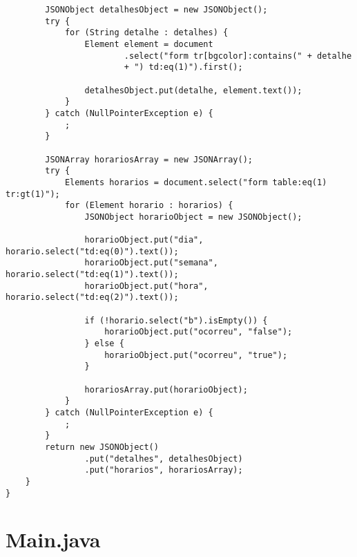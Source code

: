 \begin{lstlisting}
        JSONObject detalhesObject = new JSONObject();
        try {
            for (String detalhe : detalhes) {
                Element element = document
                        .select("form tr[bgcolor]:contains(" + detalhe
                        + ") td:eq(1)").first();

                detalhesObject.put(detalhe, element.text());
            }
        } catch (NullPointerException e) {
            ;
        }

        JSONArray horariosArray = new JSONArray();
        try {
            Elements horarios = document.select("form table:eq(1) tr:gt(1)");
            for (Element horario : horarios) {
                JSONObject horarioObject = new JSONObject();

                horarioObject.put("dia", horario.select("td:eq(0)").text());
                horarioObject.put("semana", horario.select("td:eq(1)").text());
                horarioObject.put("hora", horario.select("td:eq(2)").text());

                if (!horario.select("b").isEmpty()) {
                    horarioObject.put("ocorreu", "false");
                } else {
                    horarioObject.put("ocorreu", "true");
                }

                horariosArray.put(horarioObject);
            }
        } catch (NullPointerException e) {
            ;
        }
        return new JSONObject()
                .put("detalhes", detalhesObject)
                .put("horarios", horariosArray);
    }
}
\end{lstlisting}

\section{Main.java}

